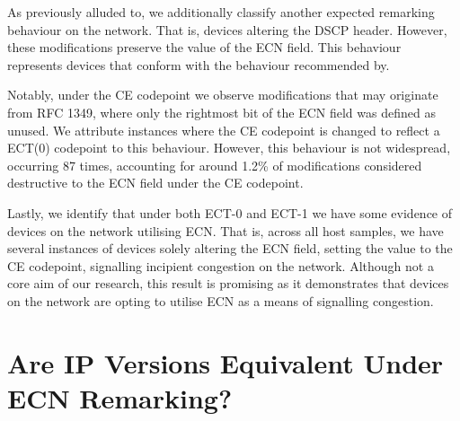 \documentclass{l4proj}
\begin{document}
As previously alluded to, we additionally classify another expected remarking behaviour on the network. That is, devices altering the DSCP header. However, these modifications preserve the value of the ECN field. This behaviour represents devices that conform with the behaviour recommended by\cite{rfc3168}.

Notably, under the CE codepoint we observe modifications that may originate from RFC 1349\cite{rfc1349}, where only the rightmost bit of the ECN field was defined as unused. We attribute instances where the CE codepoint is changed to reflect a ECT(0) codepoint to this behaviour. However, this behaviour is not widespread, occurring 87 times,  accounting for around 1.2\% of modifications considered destructive to the ECN field under the CE codepoint.

Lastly, we identify that under both ECT-0 and ECT-1 we have some evidence of devices on the network utilising ECN. That is, across all host samples, we have several instances of devices solely altering the ECN field, setting the value to the CE codepoint, signalling incipient congestion on the network. Although not a core aim of our research, this result is promising as it demonstrates that devices on the network are opting to utilise ECN as a means of signalling congestion.




\section{Are IP Versions Equivalent Under ECN Remarking?}
\end{document}
